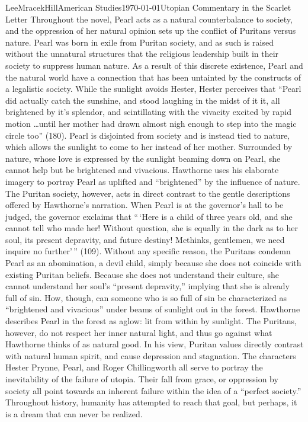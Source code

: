 \documentclass[12pt, letterpaper]{article}
\begin{document}
\begin{mla}{Lee}{Mracek}{Hill}{American Studies}{\today}{Utopian Commentary in the Scarlet Letter}
        Throughout the novel, Pearl acts as a natural counterbalance to society, and the oppression of her natural opinion sets up the conflict of Puritans versus nature. Pearl was born in exile from Puritan society, and as such is raised without the unnatural structures that the religious leadership built in their society to suppress human nature. As a result of this discrete existence, Pearl and the natural world have a connection that has been untainted by the constructs of a legalistic society. While the sunlight avoids Hester, Hester perceives that ``Pearl did actually catch the sunshine, and stood laughing in the midst of it it, all brightened by it's splendor, and scintillating with the vivacity excited by rapid motion \ldots until her mother had drawn almost nigh enough to step into the magic circle too'' (180). Pearl is disjointed from society and is instead tied to nature, which allows the sunlight to come to her instead of her mother. Surrounded by nature, whose love is expressed by the sunlight beaming down on Pearl, she cannot help but be brightened and vivacious. Hawthorne uses his elaborate imagery to portray Pearl as uplifted and ``brightened'' by the influence of nature. The Puritan society, however, acts in direct contrast to the gentle descriptions offered by Hawthorne's narration. When Pearl is at the governor's hall to be judged, the governor exclaims that ``\,`Here is a child of three years old, and she cannot tell who made her! Without question, she is equally in the dark as to her soul, its present depravity, and future destiny! Methinks, gentlemen, we need inquire no further'\,'' (109). Without any specific reason, the Puritans condemn Pearl as an abomination, a devil child, simply because she does not coincide with existing Puritan beliefs. Because she does not understand their culture, she cannot understand her soul's ``present depravity,'' implying that she is already full of sin. How, though, can someone who is so full of sin be characterized as ``brightened and vivacious'' under beams of sunlight out in the forest. Hawthorne describes Pearl in the forest as aglow: lit from within by sunlight. The Puritans, however, do not respect her inner natural light, and thus go against what Hawthorne thinks of as natural good. In his view, Puritan values directly contrast with natural human spirit, and cause depression and stagnation.
        The characters Hester Prynne, Pearl, and Roger Chillingworth all serve to portray the inevitability of the failure of utopia. Their fall from grace, or oppression by society all point towards an inherent failure within the idea of a ``perfect society.'' Throughout history, humanity has attempted to reach that goal, but perhaps, it is a dream that can never be realized.
\end{mla}
\end{document}
